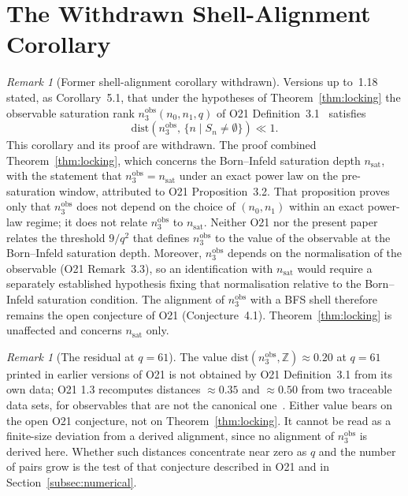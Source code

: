 \documentclass[12pt,a4paper]{article}
\theoremstyle{remark}
\newtheorem{remark}[theorem]{Remark}
\newcommand{\nsat}{n_{\mathrm{sat}}}
\newcommand{\nobs}{n^{\mathrm{obs}}_3}
\begin{document}
  \section{The Withdrawn Shell-Alignment Corollary}
  \label{sec:corollary_alignment}

  \begin{remark}[Former shell-alignment corollary withdrawn]
    \label{cor:alignment}
    Versions up to~1.18 stated, as Corollary~5.1, that under the hypotheses of
    Theorem~\ref{thm:locking} the observable saturation rank $\nobs(n_0, n_1, q)$ of O21
    Definition~3.1~\cite{Beau2026a25} satisfies
    \begin{equation}
      \label{eq:alignment}
      \mathrm{dist}\!\left(\nobs,\, \{n \mid S_n \neq \emptyset\}\right) \ll 1 .
    \end{equation}
    This corollary and its proof are withdrawn.
    The proof combined Theorem~\ref{thm:locking}, which concerns the Born--Infeld saturation
    depth $\nsat$, with the statement that $\nobs = \nsat$ under an exact power law on the
    pre-saturation window, attributed to O21 Proposition~3.2.
    That proposition proves only that $\nobs$ does not depend on the choice of $(n_0, n_1)$
    within an exact power-law regime; it does not relate $\nobs$ to $\nsat$.
    Neither O21 nor the present paper relates the threshold $9/q^2$ that defines $\nobs$ to
    the value of the observable at the Born--Infeld saturation depth.
    Moreover, $\nobs$ depends on the normalisation of the observable
    (O21 Remark~3.3), so an identification with $\nsat$ would require a separately
    established hypothesis fixing that normalisation relative to the Born--Infeld saturation
    condition.
    The alignment of $\nobs$ with a BFS shell therefore remains the open conjecture of O21
    (Conjecture~4.1).
    Theorem~\ref{thm:locking} is unaffected and concerns $\nsat$ only.
  \end{remark}

  \begin{remark}[The residual at $q = 61$]
    \label{rem:finite_size}
    The value $\mathrm{dist}(\nobs, \mathbb{Z}) \approx 0.20$ at $q = 61$ printed in earlier versions
    of O21 is not obtained by O21 Definition~3.1 from its own data; O21 1.3 recomputes distances
    $\approx 0.35$ and $\approx 0.50$ from two traceable data sets, for observables that are not the
    canonical one~\cite{Beau2026a25}.
    Either value bears on the open O21 conjecture, not on Theorem~\ref{thm:locking}.
    It cannot be read as a finite-size deviation from a derived alignment, since no alignment
    of $\nobs$ is derived here.
    Whether such distances concentrate near zero as $q$ and the number of pairs grow is the
    test of that conjecture described in O21 and in Section~\ref{subsec:numerical}.
  \end{remark}
\end{document}
